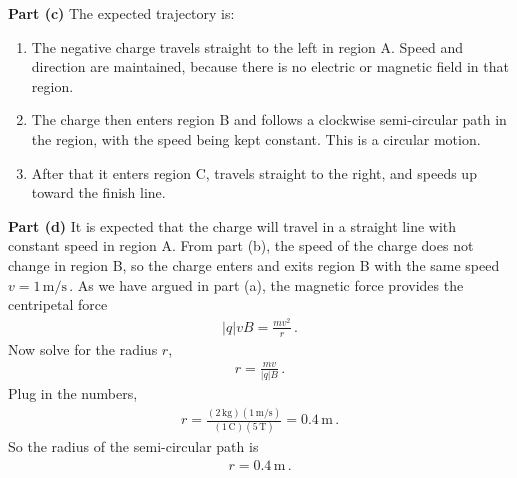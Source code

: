 \documentclass[11pt]{article}
\begin{document}
\noindent\textbf{Part (c)} The expected trajectory is:
\begin{enumerate}
\item The negative charge travels straight to the left in region A. Speed and direction are maintained, because there is no electric or magnetic field in that region.
\item The charge then enters region B and follows a clockwise semi-circular path in the region, with the speed being kept constant. This is a circular motion.
\item After that it enters region C, travels straight to the right, and speeds up toward the finish line.\\
\end{enumerate}

\noindent\textbf{Part (d)} It is expected that the charge will travel in a straight line with constant speed in region A. From part (b), the speed of the charge does not change in region B, so the charge enters and exits region B with the same speed $v = 1\,\text{m/s}\,.$ As we have argued in part (a),
the magnetic force provides the centripetal force
\begin{align*}
|q|vB = \frac{mv^2}{r}\,.
\end{align*}
Now solve for the radius $r$,
\begin{align*}
r = \frac{mv}{|q|B}\,.
\end{align*}
Plug in the numbers,
\begin{align*}
r = \frac{(2\,\text{kg})(1\,\text{m/s})}{(1\,\text{C})(5\,\text{T})}
= 0.4\,\text{m}\,.
\end{align*}
So the radius of the semi-circular path is
\begin{align*}
r = 0.4\,\text{m}\,.
\end{align*}
\end{document}
